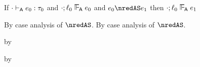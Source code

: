 \begin{lemma}\label{A-S-label-preservation}
  If\/ ${\cdot} \vdash_{\mathsf{A}} e_0 : \tau_0$
  and\/ $\snil; \sowner_0 \sWLA \sexpr_0$
  and\/ $\sexpr_0 \nredAS \sexpr_1$
  then\/ $\snil; \sowner_0 \sWLA \sexpr_1$
\end{lemma}{
  \newcommand{\shortpf}{By case analysis of $\nredAS$.}
\begin{lamportproof*}
  \shortpf
  \mainproof
  \shortpf

    \begin{pfproof}
      \qedstep
        \begin{pfproof}
          by 
        \end{pfproof}
    \end{pfproof}

    \begin{pfproof}
      \qedstep
        \begin{pfproof}
          by 
        \end{pfproof}
    \end{pfproof}


\end{lamportproof*}}
